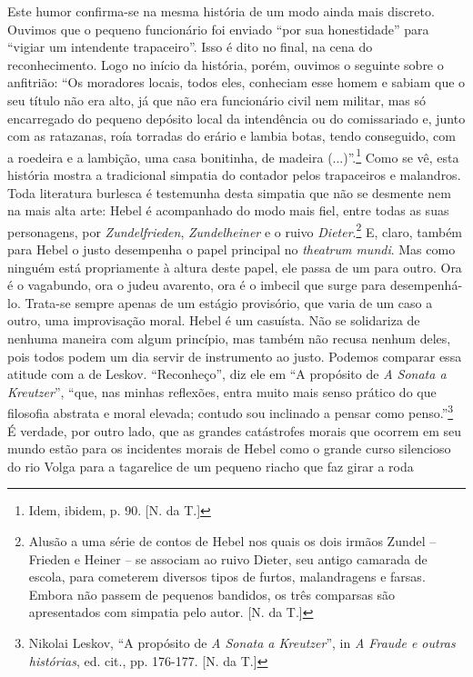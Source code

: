 Este humor confirma-se na mesma história de um modo ainda mais discreto.
Ouvimos que o pequeno funcionário foi enviado ``por sua honestidade''
para ``vigiar um intendente trapaceiro''. Isso é dito no final, na cena
do reconhecimento. Logo no início da história, porém, ouvimos o seguinte
sobre o anfitrião: ``Os moradores locais, todos eles, conheciam esse
homem e sabiam que o seu título não era alto, já que não era funcionário
civil nem militar, mas só encarregado do pequeno depósito local da
intendência ou do comissariado e, junto com as ratazanas, roía torradas
do erário e lambia botas, tendo conseguido, com a roedeira e a lambição,
uma casa bonitinha, de madeira (...)''.\footnote{Idem, ibidem, p. 90.
  {[}N. da T.{]}} Como se vê, esta história mostra a tradicional
simpatia do contador pelos trapaceiros e malandros. Toda literatura
burlesca é testemunha desta simpatia que não se desmente nem na mais
alta arte: Hebel é acompanhado do modo mais fiel, entre todas as suas
personagens, por \emph{Zundelfrieden}, \emph{Zundelheiner} e o ruivo
\emph{Dieter}.\footnote{Alusão a uma série de contos de Hebel nos quais
  os dois irmãos Zundel -- Frieden e Heiner -- se associam ao ruivo
  Dieter, seu antigo camarada de escola, para cometerem diversos tipos
  de furtos, malandragens e farsas. Embora não passem de pequenos
  bandidos, os três comparsas são apresentados com simpatia pelo autor.
  {[}N. da T.{]}} E, claro, também para Hebel o justo desempenha o papel
principal no \emph{theatrum mundi}. Mas como ninguém está propriamente à
altura deste papel, ele passa de um para outro. Ora é o vagabundo, ora o
judeu avarento, ora é o imbecil que surge para desempenhá-lo. Trata-se
sempre apenas de um estágio provisório, que varia de um caso a outro,
uma improvisação moral. Hebel é um casuísta. Não se solidariza de
nenhuma maneira com algum princípio, mas também não recusa nenhum deles,
pois todos podem um dia servir de instrumento ao justo. Podemos comparar
essa atitude com a de Leskov. ``Reconheço'', diz ele em ``A propósito de
\emph{A Sonata a Kreutzer}'', ``que, nas minhas reflexões, entra muito
mais senso prático do que filosofia abstrata e moral elevada; contudo
sou inclinado a pensar como penso.''\footnote{Nikolai Leskov, ``A
  propósito de \emph{A Sonata a Kreutzer}'', in \emph{A Fraude e outras
  histórias}, ed. cit., pp. 176-177. {[}N. da T.{]}} É verdade, por
outro lado, que as grandes catástrofes morais que ocorrem em seu mundo
estão para os incidentes morais de Hebel como o grande curso silencioso
do rio Volga para a tagarelice de um pequeno riacho que faz girar a roda
